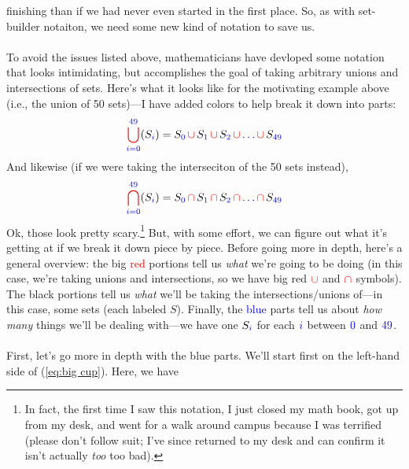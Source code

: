 \documentclass[10pt]{article}
\theoremstyle{definition}
\let\oldref\ref
\renewcommand{\ref}[1]{(\oldref{#1})}
\begin{document}
finishing than if we had never even started in the first place.  So,
as with set-builder notaiton, we need some new kind of notation to
save us.\\~\\  To avoid the issues listed above, mathematicians have
devloped some notation that looks intimidating, but accomplishes the
goal of taking arbitrary unions and intersections of sets.  Here's
what it looks like for the motivating example above (i.e., the union
of 50 sets)---I have added colors to help break it down into parts:
\begin{equation}\label{eq:big cup}
{\color{red}\bigcup^{{\color{blue}49}}_{\color{blue}i={0}}}(S_{\color{blue}i})
=
S_{\color{blue}0}\,{\color{red}\cup}\,S_{\color{blue}1}\,{\color{red}\cup}
\,S_{\color{blue}2} \,{\color{red}\cup} \,{\color{blue}\ldots}
\,{\color{red}\cup}\, S_{\color{blue}49}
\end{equation}
And likewise (if we were taking the interseciton of the 50 sets instead),
\begin{equation}\label{eq:big cap}
{\color{red}\bigcap^{{\color{blue}49}}_{\color{blue}i=0}}(S_{\color{blue}i})
=
S_{\color{blue}0}\,{\color{red}\cap}\,S_{\color{blue}1}\,{\color{red}\cap}
\,S_{\color{blue}2} \,{\color{red}\cap} \,{\color{blue}\ldots}
\,{\color{red}\cap}\, S_{\color{blue}49}
\end{equation}
Ok, those look pretty scary.\footnote{In fact, the first time I saw
  this notation, I just closed my math book, got up from my desk, and
  went for a walk around campus because I was terrified (please don't
  follow suit; I've since returned to my desk and can confirm it isn't
  actually \emph{too} too bad).}  But, with some effort, we can figure
out what it's getting at if we break it down piece by piece.  Before
going more in depth, here's a general overview: the big
\textcolor{red}{red} portions tell us \emph{what} we're going to be
doing (in this case, we're taking unions and intersections, so we have
big red $\color{red}\cup$ and $\color{red}\cap$ symbols).  The black
portions tell us \emph{what} we'll be taking the intersections/unions
of---in this case, some sets (each labeled $S$).  Finally, the
\textcolor{blue}{blue} parts tell us about \emph{how many} things
we'll be dealing with---we have one $S_{\color{blue}i}$ for each
$\color{blue}i$ between $\color{blue}0$ and $\color{blue}49$.  \\~\\
First, let's go more in depth with the blue parts.  We'll start first
on the left-hand side of \ref{eq:big cup}.  Here, we have
\end{document}
